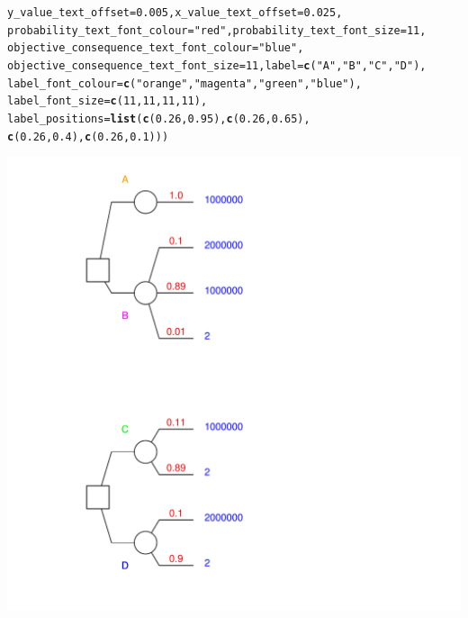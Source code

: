 \documentclass{article}\usepackage[]{graphicx}\usepackage[]{color}
\makeatletter
\newcommand{\hlnum}[1]{\textcolor[rgb]{0.686,0.059,0.569}{#1}}%
\newcommand{\hlstr}[1]{\textcolor[rgb]{0.192,0.494,0.8}{#1}}%
\newcommand{\hlstd}[1]{\textcolor[rgb]{0.345,0.345,0.345}{#1}}%
\newcommand{\hlkwc}[1]{\textcolor[rgb]{0.333,0.667,0.333}{#1}}%
\newcommand{\hlkwd}[1]{\textcolor[rgb]{0.737,0.353,0.396}{\textbf{#1}}}%
\newenvironment{kframe}{%
 \def\at@end@of@kframe{}%
 \ifinner\ifhmode%
  \def\at@end@of@kframe{\end{minipage}}%
  \begin{minipage}{\columnwidth}%
 \fi\fi%
 \def\FrameCommand##1{\hskip\@totalleftmargin \hskip-\fboxsep
 \colorbox{shadecolor}{##1}\hskip-\fboxsep
     \hskip-\linewidth \hskip-\@totalleftmargin \hskip\columnwidth}%
 \MakeFramed {\advance\hsize-\width
   \@totalleftmargin\z@ \linewidth\hsize
   \@setminipage}}%
 {\par\unskip\endMakeFramed%
 \at@end@of@kframe}
\newenvironment{knitrout}{}{} %
\makeatother
\begin{document}
\begin{knitrout}
\begin{kframe}
\begin{alltt}
        \hlkwc{y_value_text_offset}\hlstd{=}\hlnum{0.005}\hlstd{,} \hlkwc{x_value_text_offset}\hlstd{=}\hlnum{0.025}\hlstd{,}
        \hlkwc{probability_text_font_colour}\hlstd{=}\hlstr{"red"}\hlstd{,} \hlkwc{probability_text_font_size}\hlstd{=}\hlnum{11}\hlstd{,}
        \hlkwc{objective_consequence_text_font_colour}\hlstd{=}\hlstr{"blue"}\hlstd{,}
        \hlkwc{objective_consequence_text_font_size}\hlstd{=}\hlnum{11}\hlstd{,} \hlkwc{label}\hlstd{=}\hlkwd{c}\hlstd{(}\hlstr{"A"}\hlstd{,}\hlstr{"B"}\hlstd{,}\hlstr{"C"}\hlstd{,} \hlstr{"D"}\hlstd{),}
        \hlkwc{label_font_colour}\hlstd{=}\hlkwd{c}\hlstd{(}\hlstr{"orange"}\hlstd{,}\hlstr{"magenta"}\hlstd{,}\hlstr{"green"}\hlstd{,}\hlstr{"blue"}\hlstd{),}
        \hlkwc{label_font_size}\hlstd{=}\hlkwd{c}\hlstd{(}\hlnum{11}\hlstd{,}\hlnum{11}\hlstd{,}\hlnum{11}\hlstd{,}\hlnum{11}\hlstd{),}
        \hlkwc{label_positions}\hlstd{=}\hlkwd{list}\hlstd{(}\hlkwd{c}\hlstd{(}\hlnum{0.26}\hlstd{,}\hlnum{0.95}\hlstd{),}\hlkwd{c}\hlstd{(}\hlnum{0.26}\hlstd{,}\hlnum{0.65}\hlstd{),}
                \hlkwd{c}\hlstd{(}\hlnum{0.26}\hlstd{,}\hlnum{0.4}\hlstd{),}\hlkwd{c}\hlstd{(}\hlnum{0.26}\hlstd{,}\hlnum{0.1}\hlstd{)))}
\end{alltt}
\end{kframe}

{\centering \includegraphics[width=0.8\linewidth]{figure/unnamed-chunk-10} 

}



\end{knitrout}
\end{document}
